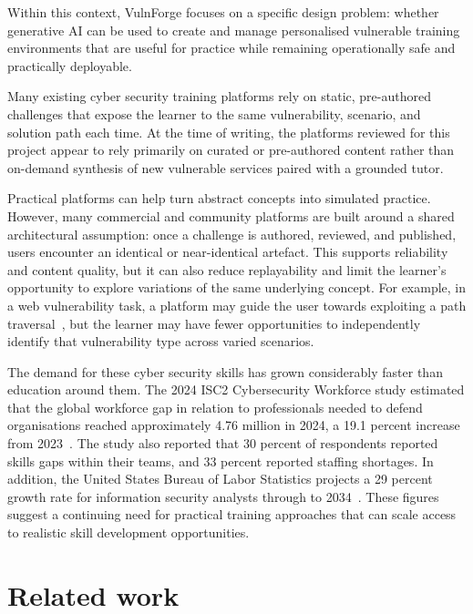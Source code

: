 Within this context, VulnForge focuses on a specific design problem: whether generative AI can be used to create and manage personalised vulnerable training environments that are useful for practice while remaining operationally safe and practically deployable.

Many existing cyber security training platforms rely on static, pre-authored challenges that expose the learner to the same vulnerability, scenario, and solution path each time. At the time of writing, the platforms reviewed for this project appear to rely primarily on curated or pre-authored content rather than on-demand synthesis of new vulnerable services paired with a grounded tutor.

Practical platforms can help turn abstract concepts into simulated practice. However, many commercial and community platforms are built around a shared architectural assumption: once a challenge is authored, reviewed, and published, users encounter an identical or near-identical artefact. This supports reliability and content quality, but it can also reduce replayability and limit the learner's opportunity to explore variations of the same underlying concept. For example, in a web vulnerability task, a platform may guide the user towards exploiting a path traversal~\citep{noauthor_cwe_nodate}, but the learner may have fewer opportunities to independently identify that vulnerability type across varied scenarios.

The demand for these cyber security skills has grown considerably faster than education around them. The 2024 ISC2 Cybersecurity Workforce study estimated that the global workforce gap in relation to professionals needed to defend organisations reached approximately 4.76 million in 2024, a 19.1 percent increase from 2023~\citep{noauthor_results_nodate}. The study also reported that 30 percent of respondents reported skills gaps within their teams, and 33 percent reported staffing shortages. In addition, the United States Bureau of Labor Statistics projects a 29 percent growth rate for information security analysts through to 2034~\citep{noauthor_information_nodate}. These figures suggest a continuing need for practical training approaches that can scale access to realistic skill development opportunities.

\section{Related work}\label{sec:related}

